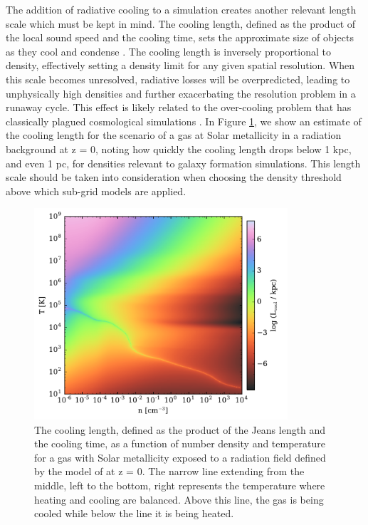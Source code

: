 The addition of radiative cooling to a simulation creates another
relevant length scale which must be kept in mind.  The cooling length,
defined as the product of the local sound speed and the cooling time,
sets the approximate size of objects as they cool and condense
\citep{2009A&A...508..725I}.  The cooling length is inversely
proportional to density, effectively setting a density limit for
any given spatial resolution.  When this scale becomes unresolved,
radiative losses will be overpredicted, leading to unphysically high
densities and further exacerbating the resolution problem in a runaway
cycle.  This effect is likely related to the over-cooling problem that
has classically plagued cosmological simulations
\citep[e.g.][]{1996ApJS..105...19K, 2001MNRAS.326.1228B}.
In Figure \ref{fig:cooling-length}, we show an estimate of the
cooling length for the scenario of a gas at Solar metallicity in a
\citet{2012ApJ...746..125H} radiation background at z = 0, noting how
quickly the cooling length drops below 1 kpc, and even 1 pc, for
densities relevant to galaxy formation simulations.  This
length scale should be taken into consideration when choosing the
density threshold above which sub-grid models are applied.

\begin{figure}
  \centering
  \includegraphics[width=0.84\textwidth]{cooling_length.pdf}
  \caption{
    The cooling length, defined as the product of the Jeans length and
    the cooling time, as a function of number density and temperature
    for a gas with Solar metallicity exposed to a radiation field
    defined by the model of \citet{2012ApJ...746..125H} at z = 0.  The
    narrow line extending from the middle, left to the bottom, right
    represents the temperature where heating and cooling are
    balanced.  Above this line, the gas is being cooled while below
    the line it is being heated.
  } \label{fig:cooling-length}
\end{figure}

